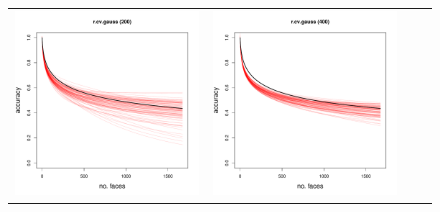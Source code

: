 \documentclass[twoside,11pt]{article}
\begin{document}
\begin{figure}
\begin{tabular}{cccc}
\includegraphics[scale = 0.2, clip = true, trim = 0 0 0 0.6in]{repeat_200_r_cv_gauss.pdf} &
\includegraphics[scale = 0.2, clip = true, trim = 0 0 0 0.6in]{repeat_400_r_cv_gauss.pdf} \\

\end{tabular}
\end{figure}
\end{document}
